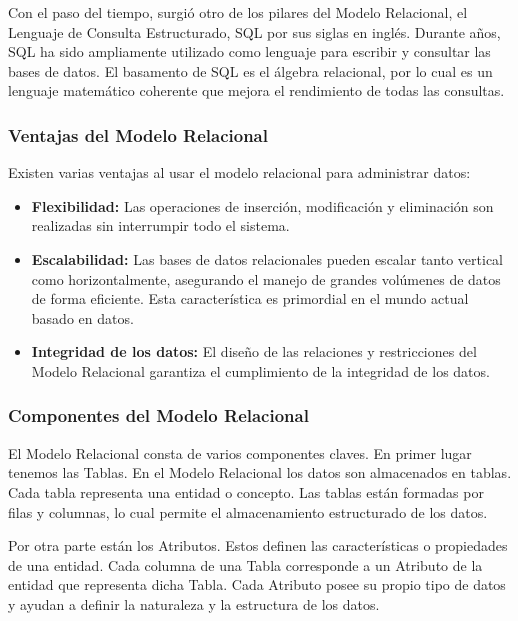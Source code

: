 Con el paso del tiempo, surgió otro de los pilares del Modelo Relacional, el Lenguaje de Consulta Estructurado, SQL por 
sus siglas en ingl\'es. Durante años, SQL ha sido ampliamente utilizado como lenguaje para escribir y consultar las bases 
de datos. El basamento de SQL es el \'algebra relacional, por lo cual es un lenguaje matemático coherente que mejora el 
rendimiento de todas las consultas.


\subsubsection{Ventajas del Modelo Relacional}

Existen varias ventajas al usar el modelo relacional para administrar datos:

\begin{itemize}
    \item \textbf{Flexibilidad:} Las operaciones de inserción, modificación y eliminaci\'on son realizadas sin interrumpir
        todo el sistema. 
    
    \item \textbf{Escalabilidad:} Las bases de datos relacionales pueden escalar tanto vertical como horizontalmente, 
        asegurando el manejo de grandes volúmenes de datos de forma eficiente. Esta característica es primordial en el 
        mundo actual basado en datos.

    \item \textbf{Integridad de los datos:} El diseño de las relaciones y restricciones del Modelo Relacional garantiza 
        el cumplimiento de la integridad de los datos. 
\end{itemize}


\subsubsection{Componentes del Modelo Relacional}

El Modelo Relacional consta de varios componentes claves. En primer lugar tenemos las Tablas. En el Modelo Relacional 
los datos son almacenados en tablas. Cada tabla representa una entidad o concepto. Las tablas est\'an formadas por filas 
y columnas, lo cual permite el almacenamiento estructurado de los datos.

Por otra parte est\'an los Atributos. Estos definen las características o propiedades de una entidad. Cada columna de una 
Tabla corresponde a un Atributo de la entidad que representa dicha Tabla. Cada Atributo posee su propio tipo de datos y 
ayudan a definir la naturaleza y la estructura de los datos.

